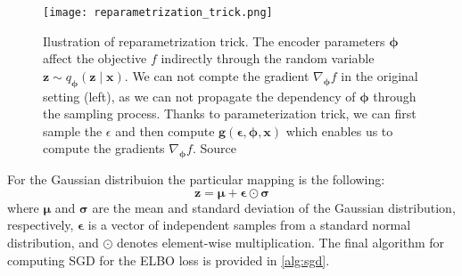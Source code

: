\begin{figure}[t]
    \centering
    \texttt{[image: reparametrization\_trick.png]}
    \caption[Reparametrization trick]{Ilustration of reparametrization trick. The encoder parameters ${\boldsymbol{\phi}}$ affect the objective $f$ indirectly through the random variable $\mathbf{z} \sim  q_{\boldsymbol{\phi}}(\mathbf{z}\mid \mathbf{x})$.
    We can not compte the gradient $\nabla_{\boldsymbol{\phi}} f$ in the original setting (left), as we can not propagate the dependency of ${\boldsymbol{\phi}}$ through the sampling process. Thanks to parameterization trick, we 
    can first sample the $\epsilon$ and then compute $\mathbf{g}(\boldsymbol{\epsilon},{\boldsymbol{\phi}},\mathbf{x})$ which enables us to compute the gradients $\nabla_{\boldsymbol{\phi}} f$.
    Source \cite{intro-vae-2019}}
    \label{fig:reparam_trick}
\end{figure}
For the Gaussian distribuion the particular mapping is the following:
$$
\mathbf{z} = \boldsymbol{\mu} + \boldsymbol{\epsilon} \odot \boldsymbol{\sigma}
$$
where $\boldsymbol{\mu}$ and $\boldsymbol{\sigma}$ are the mean and standard deviation of the Gaussian distribution, respectively, 
$\boldsymbol{\epsilon}$ is a vector of independent samples from a standard normal distribution, and $\odot$ denotes element-wise 
multiplication. The final algorithm for computing SGD for the ELBO loss is provided in \ref{alg:sgd}.
